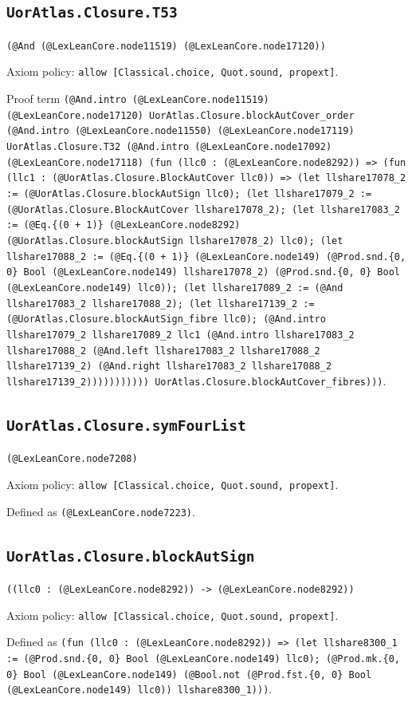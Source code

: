 \documentclass[11pt]{article}
\begin{document}
\subsection*{\texttt{UorAtlas.Closure.T53}}
\noindent\texttt{(@And (@LexLeanCore.node11519) (@LexLeanCore.node17120))}\par
\noindent Axiom policy: \texttt{allow [Classical.choice, Quot.sound, propext]}.\par
\noindent Proof term \texttt{(@And.intro (@LexLeanCore.node11519) (@LexLeanCore.node17120) UorAtlas.Closure.blockAutCover\_order (@And.intro (@LexLeanCore.node11550) (@LexLeanCore.node17119) UorAtlas.Closure.T32 (@And.intro (@LexLeanCore.node17092) (@LexLeanCore.node17118) (fun (llc0 : (@LexLeanCore.node8292)) => (fun (llc1 : (@UorAtlas.Closure.BlockAutCover llc0)) => (let llshare17078\_2 := (@UorAtlas.Closure.blockAutSign llc0); (let llshare17079\_2 := (@UorAtlas.Closure.BlockAutCover llshare17078\_2); (let llshare17083\_2 := (@Eq.\{(0 + 1)\} (@LexLeanCore.node8292) (@UorAtlas.Closure.blockAutSign llshare17078\_2) llc0); (let llshare17088\_2 := (@Eq.\{(0 + 1)\} (@LexLeanCore.node149) (@Prod.snd.\{0, 0\} Bool (@LexLeanCore.node149) llshare17078\_2) (@Prod.snd.\{0, 0\} Bool (@LexLeanCore.node149) llc0)); (let llshare17089\_2 := (@And llshare17083\_2 llshare17088\_2); (let llshare17139\_2 := (@UorAtlas.Closure.blockAutSign\_fibre llc0); (@And.intro llshare17079\_2 llshare17089\_2 llc1 (@And.intro llshare17083\_2 llshare17088\_2 (@And.left llshare17083\_2 llshare17088\_2 llshare17139\_2) (@And.right llshare17083\_2 llshare17088\_2 llshare17139\_2))))))))))) UorAtlas.Closure.blockAutCover\_fibres)))}.\par
\subsection*{\texttt{UorAtlas.Closure.symFourList}}
\noindent\texttt{(@LexLeanCore.node7208)}\par
\noindent Axiom policy: \texttt{allow [Classical.choice, Quot.sound, propext]}.\par
\noindent Defined as \texttt{(@LexLeanCore.node7223)}.\par
\subsection*{\texttt{UorAtlas.Closure.blockAutSign}}
\noindent\texttt{((llc0 : (@LexLeanCore.node8292)) -> (@LexLeanCore.node8292))}\par
\noindent Axiom policy: \texttt{allow [Classical.choice, Quot.sound, propext]}.\par
\noindent Defined as \texttt{(fun (llc0 : (@LexLeanCore.node8292)) => (let llshare8300\_1 := (@Prod.snd.\{0, 0\} Bool (@LexLeanCore.node149) llc0); (@Prod.mk.\{0, 0\} Bool (@LexLeanCore.node149) (@Bool.not (@Prod.fst.\{0, 0\} Bool (@LexLeanCore.node149) llc0)) llshare8300\_1)))}.\par
\end{document}
